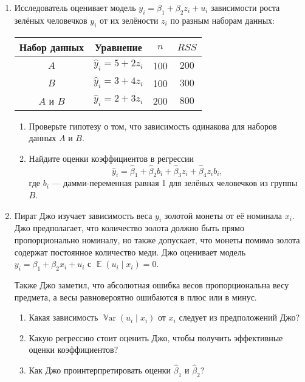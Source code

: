 \documentclass[12pt]{article}
\DeclareMathOperator{\E}{\mathbb{E}}
\DeclareMathOperator{\Var}{\mathbb{V}ar}
\begin{document}
\newpage
\begin{enumerate}
    \item Исследователь оценивает модель $y_i = \beta_1 + \beta_2 z_i + u_i$ зависимости 
    роста зелёных человечков $y_i$ от их зелёности $z_i$ по разным наборам данных:

    \begin{tabular}{cccc}
        \toprule 
        Набор данных & Уравнение & $n$ & $RSS$ \\
        \midrule
        $A$ & $\hat y_i = 5 + 2 z_i$ & 100 & $200$ \\
        $B$ & $\hat y_i = 3 + 4 z_i$ & 100 & $300$ \\
        $A$ и $B$ & $\hat y_i = 2 + 3 z_i$ & 200 & $800$ \\
        \bottomrule
    \end{tabular}

    \begin{enumerate}
        \item Проверьте гипотезу о том, что зависимость одинакова для наборов данных $A$ и $B$.
        
        \item Найдите оценки коэффициентов в регрессии 
        \[
        \hat y_i = \hat\beta_1 + \hat\beta_2 b_i + \hat\beta_3 z_i + \hat\beta_4 z_i b_i,
        \]
        где $b_i$ — дамми-переменная равная 1 для зелёных человечков из группы $B$.
        
    \end{enumerate}

    \item Пират Джо изучает зависимость веса $y_i$ золотой монеты от её номинала $x_i$. 
    Джо предполагает, что количество золота должно быть прямо пропорционально номиналу,
    но также допускает, что монеты помимо золота содержат постоянное количество меди.
    Джо оценивает модель $y_i = \beta_1 + \beta_2 x_i + u_i$ с $\E(u_i \mid x_i) = 0$.

    Также Джо заметил, что абсолютная ошибка весов пропорциональна весу предмета,
    а весы равновероятно ошибаются в плюс или в минус. 
    \begin{enumerate}
        \item Какая зависимость $\Var(u_i \mid x_i)$ от $x_i$ следует из предположений Джо?
        \item Какую регрессию стоит оценить Джо, чтобы получить эффективные оценки коэффициентов?
        \item Как Джо проинтерпретировать оценки $\hat\beta_1$ и $\hat\beta_2$?
    \end{enumerate}
    

\end{enumerate}
\end{document}
